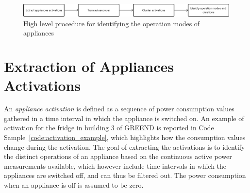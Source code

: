 \begin{figure}
  \centering
  \includegraphics[width=\linewidth]{images/modes_clustering/high_level_procedure.png}
  \caption{High level procedure for identifying the operation modes of appliances}%
  \label{fig:high_level_procedure}
\end{figure}

\section{Extraction of Appliances Activations}

An \textit{appliance activation} is defined as a sequence of power consumption values gathered in a time interval in which the appliance is switched on. An example of activation for the fridge in building 3 of GREEND is reported in Code Sample~\ref{code:activation_example}, which highlights how the consumption values change during the activation. The goal of extracting the activations is to identify the distinct operations of an appliance based on the continuous active power measurements available, which however include time intervals in which the appliances are switched off, and can thus be filtered out. The power consumption when an appliance is off is assumed to be zero.



